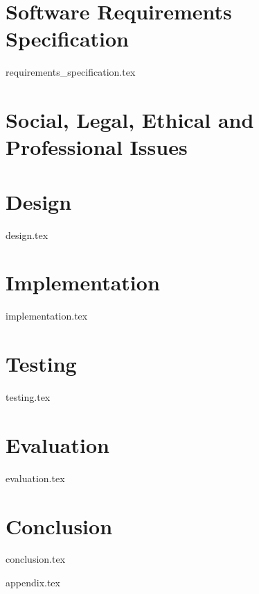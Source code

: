 \documentclass[a4paper, 12pt, oneside]{book}
\begin{document}
\chapter{Software Requirements Specification}
{requirements_specification.tex}

\chapter{Social, Legal, Ethical and Professional Issues}

\chapter{Design}
{design.tex}

\chapter{Implementation}
{implementation.tex}

\chapter{Testing}
{testing.tex}

\chapter{Evaluation}
{evaluation.tex}

\chapter{Conclusion}
{conclusion.tex}

\backmatter

\setcounter{page}{1} %



\setlength{} %
\printbibliography[heading=bibintoc, title = {References}]



\appendix
\renewcommand{\thechapter}{\alph{chapter}}
{appendix.tex}
\end{document}
